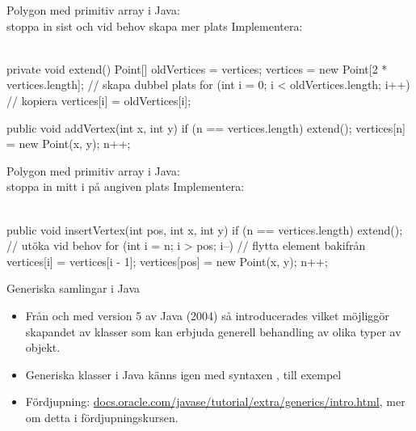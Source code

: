 \begin{Slide}{Polygon med primitiv array i Java: \\stoppa in sist och vid behov skapa mer plats}\SlideFontSmall
Implementera:\\
\\
\pause
\begin{Code}[numberstyle=,numbers=left,language=Java]
    private void extend(){
        Point[] oldVertices = vertices;
        vertices = new Point[2 * vertices.length]; // skapa dubbel plats
        for (int i = 0; i < oldVertices.length; i++) {  // kopiera
            vertices[i] = oldVertices[i];
        }
    }

    public void addVertex(int x, int y) {
        if (n == vertices.length) extend();
        vertices[n] = new Point(x, y);
        n++;
    }
\end{Code}
\end{Slide}


\begin{Slide}{Polygon med primitiv array i Java: \\stoppa in mitt i på angiven plats }\SlideFontSmall
Implementera:\\
\\
\pause
\begin{Code}[numberstyle=,numbers=left,language=Java]
    public void insertVertex(int pos, int x, int y) {
        if (n == vertices.length) extend();   // utöka vid behov
        for (int i = n; i > pos; i--) {       // flytta element bakifrån
            vertices[i] = vertices[i - 1];
        }
        vertices[pos] = new Point(x, y);
        n++;
    }
\end{Code}
\end{Slide}






\begin{Slide}{Generiska samlingar i Java}
\begin{itemize}
\item Från och med version 5 av Java (2004) så introducerades  vilket möjliggör skapandet av klasser som kan erbjuda generell behandling av olika typer av objekt.

\item Generiska klasser i Java känns igen med syntaxen , till exempel  

\item Fördjupning: \href{https://docs.oracle.com/javase/tutorial/extra/generics/intro.html}{docs.oracle.com/javase/tutorial/extra/generics/intro.html}, mer om detta i fördjupningskursen.

\end{itemize}
\end{Slide}

